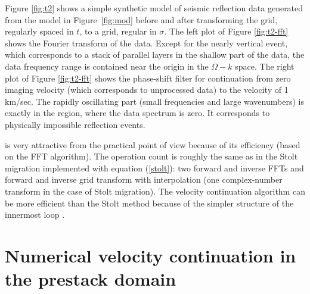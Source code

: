 Figure \ref{fig:t2} shows a simple synthetic model of seismic
reflection data generated from the model in Figure~\ref{fig:mod}
before and after transforming the grid, regularly spaced in $t$, to a
grid, regular in $\sigma$. The left plot of Figure \ref{fig:t2-fft}
shows the Fourier transform of the data. Except for the nearly
vertical event, which corresponds to a stack of parallel layers in the
shallow part of the data, the data frequency range is contained near
the origin in the $\Omega-k$ space.  The right plot of Figure
\ref{fig:t2-fft} shows the phase-shift filter for continuation from
zero imaging velocity (which corresponds to unprocessed data) to the
velocity of 1 km/sec. The rapidly oscillating part (small frequencies
and large wavenumbers) is exactly in the region, where the data
spectrum is zero. It corresponds to physically impossible reflection
events.


 is very attractive from the practical point of view
because of its efficiency (based on the FFT algorithm). The operation count is
roughly the same as in the Stolt migration implemented with equation
(\ref{stolt}): two forward and inverse FFTs and forward and inverse grid
transform with interpolation (one complex-number transform in the case of
Stolt migration). The velocity continuation algorithm can be more efficient
than the Stolt method because of the simpler structure of the innermost loop
. 

\section{Numerical velocity continuation in the prestack domain}

